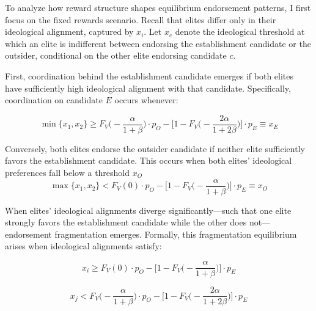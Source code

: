To analyze how reward structure shapes equilibrium endorsement patterns, I first focus on the fixed rewards scenario. Recall that elites differ only in their ideological alignment, captured by $x_i$. Let $x_c$ denote the ideological threshold at which an elite is indifferent between endorsing the establishment candidate or the outsider, conditional on the other elite endorsing candidate $c$.

First, coordination behind the establishment candidate emerges if both elites have sufficiently high ideological alignment with that candidate. Specifically, coordination on candidate $E$ occurs whenever:

\[\min\{x_1,x_2\} \geq F_V\bigg(-\frac{\alpha}{1+\beta}\bigg)\cdot p_O - \bigg[1- F_V\bigg(-\frac{2\alpha}{1+2\beta}\bigg)\bigg]\cdot p_E \equiv x_E\]

Conversely, both elites endorse the outsider candidate if neither elite sufficiently favors the establishment candidate. This occurs when both elites' ideological preferences fall below a threshold $x_O$
\[\max\{x_1,x_2\} < F_V(0)\cdot p_O - \bigg[1- F_V\bigg(-\frac{\alpha}{1+\beta}\bigg)\bigg]\cdot p_E \equiv x_O\]

When elites' ideological alignments diverge significantly—such that one elite strongly favors the establishment candidate while the other does not—endorsement fragmentation emerges. Formally, this fragmentation equilibrium arises when ideological alignments satisfy:

\[x_i \geq F_V(0)\cdot p_O - \bigg[1- F_V\bigg(-\frac{\alpha}{1+\beta}\bigg)\bigg]\cdot p_E\]

\[x_j < F_V\bigg(-\frac{\alpha}{1+\beta}\bigg)\cdot p_O - \bigg[1- F_V\bigg(-\frac{2\alpha}{1+2\beta}\bigg)\bigg]\cdot p_E\]

